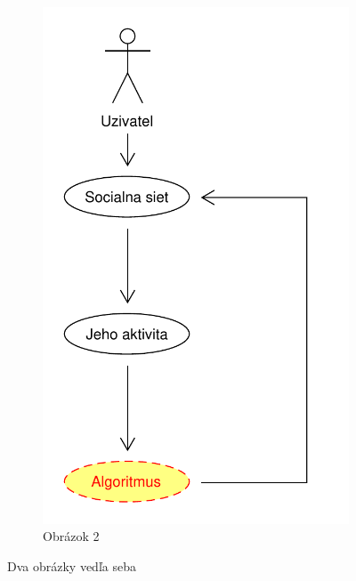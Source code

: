 \documentclass[10pt,twoside,slovak,a4paper]{article}
\begin{document}
\begin{figure}[H]
\begin{subfigure}{0.45\textwidth}
        \includegraphics[width=\linewidth]{diagram2.pdf}
        \caption{Obrázok 2}
        \label{fig:obrazok2}
    \end{subfigure}
    \caption{Dva obrázky vedľa seba}
    \label{fig:obrazky-vedla-seba}
\end{figure}
\end{document}
